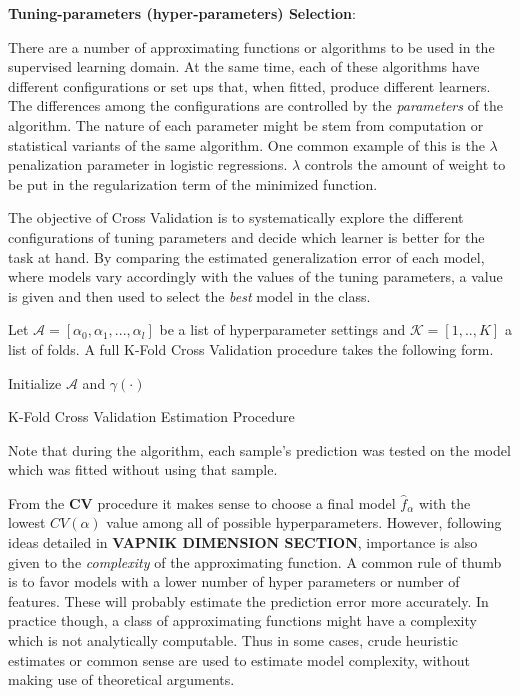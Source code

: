 \textbf{Tuning-parameters (hyper-parameters) Selection}:

There are a number of approximating functions or algorithms to be used in the supervised learning domain. At the same time, each of these algorithms have different configurations or set ups that, when fitted, produce different learners. The differences among the configurations are controlled by the \textit{parameters} of the algorithm. The nature of each parameter might be stem from computation or statistical variants of the same algorithm. One common example of this is the $\lambda$ penalization parameter in logistic regressions. $\lambda$ controls the amount of weight to be put in the regularization term of the minimized function. 

The objective of Cross Validation is to systematically explore the different configurations of tuning parameters and decide which learner is better for the task at hand. By comparing the estimated generalization error of each model, where models vary accordingly with the values of the tuning parameters, a value is given and then used to select the \textit{best} model in the class.

 Let $\mathcal{A} = [\alpha_0, \alpha_1,..., \alpha_l   ]$ be a list of hyperparameter settings and  $\mathcal{K} =[1,..,K]$ a list of folds.  A full K-Fold Cross Validation procedure takes the following form.
 
 \begin{algorithm}%
 	\SetAlgoLined
 	Initialize $\mathcal{A}$ and $\gamma(\cdot)$\;
 \caption{K-Fold Cross Validation Estimation Procedure}
\end{algorithm}

Note that during the algorithm, each sample's prediction was tested on the model which was fitted without using that sample. 

From the \textbf{CV} procedure it makes sense to choose a final  model $\hat{f}_\alpha$ with the lowest $CV(\alpha)$ value among all of possible hyperparameters. However, following ideas detailed in \textbf{VAPNIK DIMENSION SECTION}, importance is also given to the \textit{complexity} of the approximating function. A common rule of thumb is to favor models with a lower number of hyper parameters or number of features. These will probably estimate the prediction error more accurately. In practice though, a class of approximating functions might have a complexity which is not analytically computable. Thus in some cases, crude heuristic estimates or common sense are used to estimate model complexity, without making use of theoretical arguments.
 
